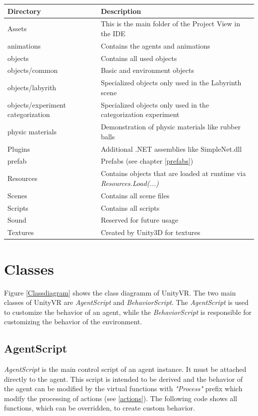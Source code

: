 \documentclass[10pt,final]{scrreprt}
\begin{document}
\begin{tabular}{|l|l|}
\hline
Directory & Description\\\hline
Assets & This is the main folder of the Project View in the IDE\\
animations & Contains the agents and animations\\
objects & Contains all used objects\\
objects/common & Basic and environment objects\\
objects/labyrith & Specialized objects only used in the Labyrinth scene\\
objects/experiment categorization&  Specialized objects only used in the categorization experiment \\
physic materials & Demonstration of physic materials like rubber balls\\
Plugins & Additional .NET assemblies like SimpleNet.dll\\
prefab & Prefabs (see chapter \ref{prefabs})\\
Resources & Contains objects that are loaded at runtime via \emph{Resources.Load(...)}\\
Scenes & Contains all scene files\\
Scripts & Contains all scripts\\
Sound & Reserved for future usage\\
Textures & Created by Unity3D for textures\\\hline
\end{tabular}


\section{Classes}

Figure \ref{Classdiagram} shows the class diagramm of UnityVR. The two main classes of UnityVR are \emph{AgentScript} and \emph{BehaviorScript}. The \emph{AgentScript} is used to customize the behavior of an agent, while the \emph{BehaviorScript} is responsible for customizing the behavior of the environment.


\subsection{AgentScript}
\label{AgentScript}

\emph{AgentScript} is the main control script of an agent instance. It must be attached directly to the agent. This script is intended to be derived and the behavior of the agent can be modified by the virtual functions with \emph{"Process"} prefix which modify the processing of actions (see \ref{actions}). The following code shows all functions, which can be overridden, to create custom behavior.
\end{document}
